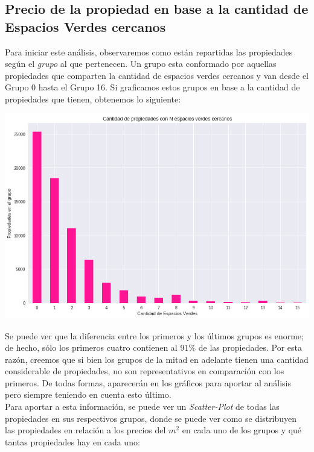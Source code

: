 \documentclass[a4paper, 10pt]{article}
\newcommand\tab[1][0.5cm]{\hspace*{#1}}
\begin{document}
		\subsection{Precio de la propiedad en base a la cantidad de Espacios Verdes cercanos}
			Para iniciar este análisis, observaremos como están repartidas las propiedades según el \emph{grupo} al que pertenecen.
			Un grupo esta conformado por aquellas propiedades que comparten la cantidad de espacios verdes cercanos y van desde el
			Grupo 0 hasta el Grupo 16. Si graficamos estos grupos en base a la cantidad de propiedades que tienen, obtenemos lo
			siguiente:
			\begin{center}
				\includegraphics[width=\textwidth]{images/parksAmountGroups}
			\end{center}			
			\tab Se puede ver que la diferencia entre los primeros y los últimos grupos es enorme; de hecho, sólo los primeros cuatro
			contienen al $91\%$ de las propiedades. Por esta razón, creemos que si bien los grupos de la mitad en adelante tienen
			una cantidad considerable de propiedades, no son representativos en comparación con los primeros. De todas formas,
			aparecerán en los gráficos para aportar al análisis pero siempre teniendo en cuenta esto último. \\
			\tab Para aportar a esta información, se puede ver un \emph{Scatter-Plot} de todas las propiedades en sus respectivos
			grupos, donde se puede ver como se distribuyen las propiedades en relación a los precios del $m^2$ en cada uno de los
			grupos y qué tantas propiedades hay en cada uno:
\end{document}
